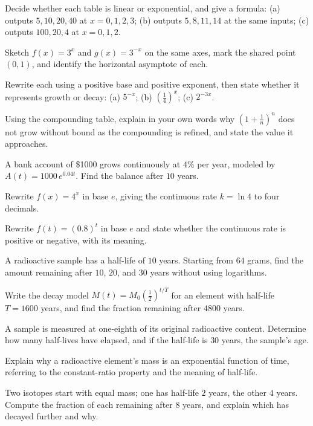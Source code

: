 \documentclass[12pt]{book}
\begin{document}
\begin{exercises}
\item Decide whether each table is linear or exponential, and give a formula:
(a) outputs $5,10,20,40$ at $x=0,1,2,3$; (b) outputs $5,8,11,14$ at the same inputs;
(c) outputs $100,20,4$ at $x=0,1,2$.

\item Sketch $f(x)=3^{x}$ and $g(x)=3^{-x}$ on the same axes, mark the shared point
$(0,1)$, and identify the horizontal asymptote of each.

\item Rewrite each using a positive base and positive exponent, then state whether it
represents growth or decay: (a) $5^{-x}$; (b) $\left(\tfrac14\right)^{x}$;
(c) $2^{-3x}$.

\item Using the compounding table, explain in your own words why
$\left(1+\tfrac1n\right)^{n}$ does not grow without bound as the compounding is
refined, and state the value it approaches.

\item A bank account of \$1000 grows continuously at $4\%$ per year, modeled by
$A(t)=1000\,e^{0.04t}$. Find the balance after $10$ years.

\item Rewrite $f(x)=4^{x}$ in base $e$, giving the continuous rate $k=\ln 4$ to four
decimals.

\item Rewrite $f(t)=(0.8)^{t}$ in base $e$ and state whether the continuous rate is
positive or negative, with its meaning.

\item A radioactive sample has a half-life of $10$ years. Starting from $64$ grams,
find the amount remaining after $10$, $20$, and $30$ years without using logarithms.

\item Write the decay model $M(t)=M_0\left(\tfrac12\right)^{t/T}$ for an element with
half-life $T=1600$ years, and find the fraction remaining after $4800$ years.

\item A sample is measured at one-eighth of its original radioactive content.
Determine how many half-lives have elapsed, and if the half-life is $30$ years, the
sample's age.

\item Explain why a radioactive element's mass is an exponential function of time,
referring to the constant-ratio property and the meaning of half-life.

\item Two isotopes start with equal mass; one has half-life $2$ years, the other
$4$ years. Compute the fraction of each remaining after $8$ years, and explain which
has decayed further and why.
\end{exercises}
\end{document}
